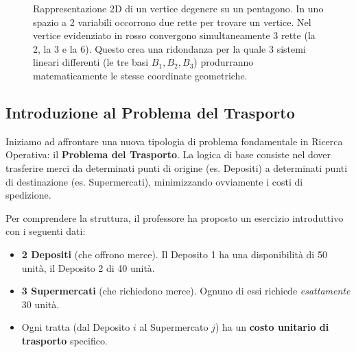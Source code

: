 \documentclass[12pt, a4paper]{article}
\begin{document}
\begin{figure}[H]
		\caption{Rappresentazione 2D di un vertice degenere su un pentagono. In uno spazio a 2 variabili occorrono due rette per trovare un vertice. Nel vertice evidenziato in rosso convergono simultaneamente 3 rette (la 2, la 3 e la 6). Questo crea una ridondanza per la quale 3 sistemi lineari differenti (le tre basi $B_1, B_2, B_3$) produrranno matematicamente le stesse coordinate geometriche.}
	\end{figure}
	
	\vspace{0.6cm}
	\subsection*{Introduzione al Problema del Trasporto}
	
	Iniziamo ad affrontare una nuova tipologia di problema fondamentale in Ricerca Operativa: il \textbf{Problema del Trasporto}. La logica di base consiste nel dover trasferire merci da determinati punti di origine (es. Depositi) a determinati punti di destinazione (es. Supermercati), minimizzando ovviamente i costi di spedizione.
	
	Per comprendere la struttura, il professore ha proposto un esercizio introduttivo con i seguenti dati:
	\begin{itemize}[label=\textcolor{titlecolor}{\Large\textbullet}, itemsep=2pt, leftmargin=1.5cm]
		\item \textbf{2 Depositi} (che offrono merce). Il Deposito 1 ha una disponibilità di 50 unità, il Deposito 2 di 40 unità.
		\item \textbf{3 Supermercati} (che richiedono merce). Ognuno di essi richiede \textit{esattamente} 30 unità.
		\item Ogni tratta (dal Deposito $i$ al Supermercato $j$) ha un \textbf{costo unitario di trasporto} specifico.
	\end{itemize}
	
\end{document}
